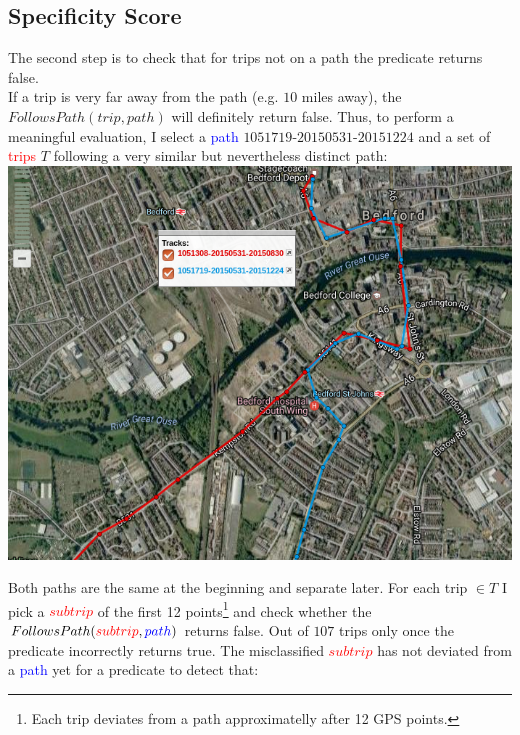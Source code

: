 \documentclass[12pt,a4paper,oneside,openright]{report}
\begin{document}
\subsection{Specificity Score}

The second step is to check that for trips not on a path
the predicate returns false. \\

If a trip is very far away from the path (e.g. $10$ miles away), the
$FollowsPath(trip, path)$ will definitely return false. Thus, to perform
a meaningful evaluation, I select a \textcolor{blue}{path}
$1051719$-$20150531$-$20151224$ and a set of \textcolor{red}{trips}
$T$ following a very similar but nevertheless distinct path: \\

\includegraphics[scale = 0.6]{figs/similar_paths.png}

Both paths are the same at the beginning and separate later. For each
trip $\in T$ I pick a \textcolor{red}{$subtrip$} of the first 12
points\footnote{Each trip deviates from a path approximatelly after 12 GPS
points.} and check whether the
$FollowsPath(\textcolor{red}{subtrip}, \textcolor{blue}{path})$ 
returns false. Out of $107$ trips only once the predicate incorrectly returns
true. The misclassified \textcolor{red}{$subtrip$} has not deviated from a
\textcolor{blue}{path} yet for a predicate to detect that: \\
\end{document}
